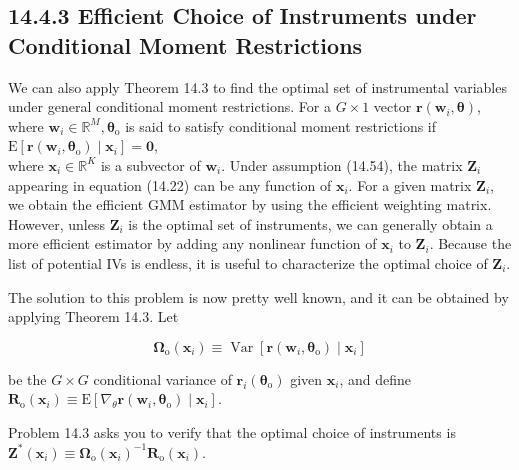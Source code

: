 \documentclass[10pt]{article}
\begin{document}
\subsection*{14.4.3 Efficient Choice of Instruments under Conditional Moment Restrictions}
We can also apply Theorem 14.3 to find the optimal set of instrumental variables under general conditional moment restrictions. For a $G \times 1$ vector $\mathbf{r}\left(\mathbf{w}_{i}, \boldsymbol{\theta}\right)$, where $\mathbf{w}_{i} \in \mathbb{R}^{M}, \boldsymbol{\theta}_{\mathrm{o}}$ is said to satisfy conditional moment restrictions if\\
$\mathrm{E}\left[\mathbf{r}\left(\mathbf{w}_{i}, \boldsymbol{\theta}_{\mathrm{o}}\right) \mid \mathbf{x}_{i}\right]=\mathbf{0}$,\\
where $\mathbf{x}_{i} \in \mathbb{R}^{K}$ is a subvector of $\mathbf{w}_{i}$. Under assumption (14.54), the matrix $\mathbf{Z}_{i}$ appearing in equation (14.22) can be any function of $\mathbf{x}_{i}$. For a given matrix $\mathbf{Z}_{i}$, we obtain the efficient GMM estimator by using the efficient weighting matrix. However, unless $\mathbf{Z}_{i}$ is the optimal set of instruments, we can generally obtain a more efficient estimator by adding any nonlinear function of $\mathbf{x}_{i}$ to $\mathbf{Z}_{i}$. Because the list of potential IVs is endless, it is useful to characterize the optimal choice of $\mathbf{Z}_{i}$.

The solution to this problem is now pretty well known, and it can be obtained by applying Theorem 14.3. Let


\begin{equation*}
\boldsymbol{\Omega}_{\mathrm{o}}\left(\mathbf{x}_{i}\right) \equiv \operatorname{Var}\left[\mathbf{r}\left(\mathbf{w}_{i}, \boldsymbol{\theta}_{\mathrm{o}}\right) \mid \mathbf{x}_{i}\right] \tag{14.55}
\end{equation*}


be the $G \times G$ conditional variance of $\mathbf{r}_{i}\left(\boldsymbol{\theta}_{\mathrm{o}}\right)$ given $\mathbf{x}_{i}$, and define\\
$\mathbf{R}_{\mathrm{o}}\left(\mathbf{x}_{i}\right) \equiv \mathrm{E}\left[\nabla_{\theta} \mathbf{r}\left(\mathbf{w}_{i}, \boldsymbol{\theta}_{\mathrm{o}}\right) \mid \mathbf{x}_{i}\right]$.

Problem 14.3 asks you to verify that the optimal choice of instruments is\\
$\mathbf{Z}^{*}\left(\mathbf{x}_{i}\right) \equiv \boldsymbol{\Omega}_{\mathrm{o}}\left(\mathbf{x}_{i}\right)^{-1} \mathbf{R}_{\mathrm{o}}\left(\mathbf{x}_{i}\right)$.
\end{document}
